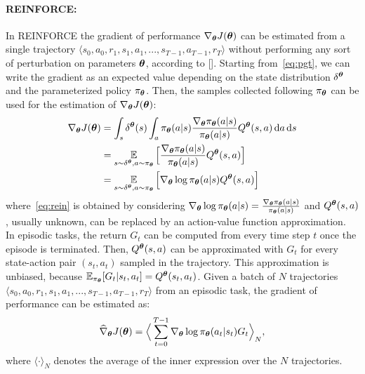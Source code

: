 \paragraph{REINFORCE:} \label{subsec:rein}
In REINFORCE the gradient of performance $\nabla_{\boldsymbol{\theta}}J(\boldsymbol{\theta})$ can be estimated from a single trajectory $\langle s_0, a_0, r_1, s_1, a_1, ..., s_{T-1}, a_{T-1}, r_{T} \rangle$ without performing any sort of perturbation on parameters $\boldsymbol{\theta}$, according to [\cite{Williams1992SimpleSG}]. Starting from~\eqref{eq:pgt}, we can write the gradient as an expected value depending on the state distribution $\delta^{\boldsymbol{\theta}}$ and the parameterized policy $\pi_{\boldsymbol{\theta}}$. Then, the samples collected following $\pi_{\boldsymbol{\theta}}$ can be used for the estimation of $\nabla_{\boldsymbol{\theta}}J(\boldsymbol{\theta})$: 
\begin{align}
\nabla_{\boldsymbol{\theta}}J(\boldsymbol{\theta}) &= \int_s \delta^{\boldsymbol{\theta}}(s) \int_a \pi_{\boldsymbol{\theta}}(a|s) \frac{\nabla_{\boldsymbol{\theta}} \pi_{\boldsymbol{\theta}}(a|s)}{\pi_{\boldsymbol{\theta}}(a|s)} Q^{\boldsymbol{\theta}}(s,a) \,\mathrm{d} a \,\mathrm{d} s \nonumber\\
&= \operatorname*{\mathbb{E}}_{s \sim \delta^{\boldsymbol{\theta}}, a \sim \pi_{\boldsymbol{\theta}}} \Big[ \frac{\nabla_{\boldsymbol{\theta}} \pi_{\boldsymbol{\theta}}(a|s)}{\pi_{\boldsymbol{\theta}}(a|s)} Q^{\boldsymbol{\theta}}(s,a) \Big] \nonumber\\
&= \operatorname*{\mathbb{E}}_{s \sim \delta^{\boldsymbol{\theta}}, a \sim \pi_{\boldsymbol{\theta}}} \Big[ \nabla_{\boldsymbol{\theta}} \log\pi_{\boldsymbol{\theta}}(a|s) Q^{\boldsymbol{\theta}}(s,a) \Big] \label{eq:rein}
\end{align}
where~\eqref{eq:rein} is obtained by considering $\nabla_{\boldsymbol{\theta}} \log\pi_{\boldsymbol{\theta}}(a|s) = \frac{\nabla_{\boldsymbol{\theta}} \pi_{\boldsymbol{\theta}}(a|s)}{\pi_{\boldsymbol{\theta}}(a|s)}$ and $Q^{\boldsymbol{\theta}}(s, a)$, usually unknown, can be replaced by an action-value function approximation.\\
\newline
In episodic tasks, the return $G_t$ can be computed from every time step $t$ once the episode is terminated. Then, $Q^{\boldsymbol{\theta}}(s, a)$ can be approximated with $G_{t}$ for every state-action pair $(s_t, a_t)$ sampled in the trajectory. This approximation is unbiased, because $\operatorname*{\mathbb{E}}_{\pi_{\boldsymbol{\theta}}}[G_t | s_t, a_t] = Q^{\boldsymbol{\theta}}(s_t, a_t)$.
Given a batch of $N$ trajectories $\langle s_0, a_0, r_1, s_1, a_1, ..., s_{T-1}, a_{T-1}, r_{T} \rangle$ from an episodic task, the gradient of performance can be estimated as:
\begin{align}
	\widehat{\nabla}_{\boldsymbol{\theta}}J(\boldsymbol{\theta}) = \Big\langle \sum_{t=0}^{T-1} \nabla_{\boldsymbol{\theta}} \log\pi_{\boldsymbol{\theta}}(a_t|s_t) G_{t} \Big\rangle_{N}, \label{eq:estrein}
\end{align}
where $\langle \cdot \rangle_{N}$ denotes the average of the inner expression over the $N$ trajectories.\\
